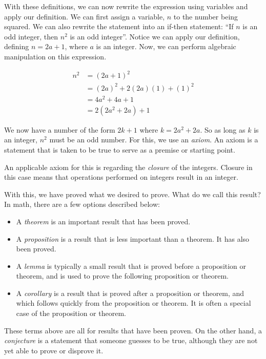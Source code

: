 \documentclass{article}
\theoremstyle{definition}
\theoremstyle{plain}
\theoremstyle{activity}
\begin{document}
With these definitions, we can now rewrite the expression using variables and apply our definition. We can first assign a variable, $n$ to the number being squared. We can also rewrite the statement into an if-then statement: ``If $n$ is an odd integer, then $n^2$ is an odd integer''. Notice we can apply our definition, defining $n = 2a+1$, where $a$ is an integer. Now, we can perform algebraic manipulation on this expression.

\begin{align*}
    n^2 &= (2a + 1)^2 \\
    &= (2a)^2 + 2(2a)(1) + (1)^2 \\
    &= 4a^2 + 4a + 1 \\
    &= 2(2a^2 + 2a) + 1
\end{align*}

We now have a number of the form $2k + 1$ where $k = 2a^2 + 2a$. So as long as $k$ is an integer, $n^2$ must be an odd number. For this, we use an \emph{axiom}. An axiom is a statement that is taken to be true to serve as a premise or starting point.

An applicable axiom for this is regarding the \emph{closure} of the integers. Closure in this case means that operations performed on integers result in an integer.

With this, we have proved what we desired to prove. What do we call this result? In math, there are a few options described below:

\begin{itemize}
    \item A \emph{theorem} is an important result that has been proved.
    \item A \emph{proposition} is a result that is less important than a theorem. It has also been proved.
    \item A \emph{lemma} is typically a small result that is proved before a proposition or theorem, and is used to prove the following proposition or theorem.
    \item A \emph{corollary} is a result that is proved after a proposition or theorem, and which follows quickly from the proposition or theorem. It is often a special case of the proposition or theorem.
\end{itemize}

These terms above are all for results that have been proven. On the other hand, a \emph{conjecture} is a statement that someone guesses to be true, although they are not yet able to prove or disprove it.
\end{document}
